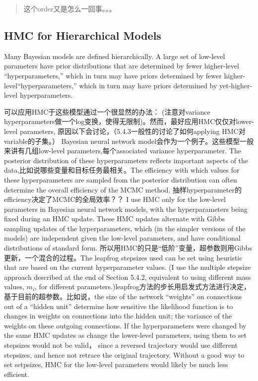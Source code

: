 \documentclass[
]{book}
\theoremstyle{definition}
\theoremstyle{definition}
\theoremstyle{definition}
\theoremstyle{remark}
\begin{document}
\begin{quote}
这个order又是怎么一回事。。。
\end{quote}

\hypertarget{hmc-for-hierarchical-models}{%
\subsection{HMC for Hierarchical Models}\label{hmc-for-hierarchical-models}}

Many Bayesian models are defined hierarchically. A large set of low-level parameters have prior distributions that are determined by fewer higher-level ``hyperparameters,'' which in turn may have priors determined by fewer higher-level``hyperparameters,'' which in turn may have priors determined by yet-higher-level hyperparameters.

可以应用HMC于这些模型通过一个很显然的办法： (注意对variance hyperparameters做一个log变换，使得无限制)。然而，最好应用HMC仅仅对lower-level parameters, 原因以下会讨论，（5.4.3一般性的讨论了如何applying HMC对variable的子集。）
Bayesian neural network model会作为一个例子。这些模型一般来讲有几组low-level parameters,每个associated variance hyperparameter. The posterior distribution of these hyperparameters reflects important aspects of the data,比如说哪些变量和目标任务最相关。The efficiency with which values for these hyperparameters are sampled from the posterior distribution can often determine the overall efficiency of the MCMC method.
抽样hyperparameter的efficiency决定了MCMC的全局效率？？
I use HMC only for the low-level parameters in Bayesian neural network models, with the hyperparameters being fixed during an HMC update. These HMC updates alternate with Gibbs sampling updates of the hyperparameters, which (in the simpler versions of the models) are independent given the low-level parameters, and have conditional distributions of standard form.
所以用HMC的只是``低阶''变量，超参数则用Gibbs更新，一个混合的过程。The leapfrog stepsizes used can be set using heuristic that are based on the current hyperparameter values. (I use the multiple stepsize approach described at the end of Section 5.4.2, equivalent to using different mass values, \(m_i\), for different parameters.)leapfrog方法的步长用启发式方法进行决定，基于目前的超参数。比如说，the size of the network ``weights'' on connections out of a ``hidden unit'' determine how sensitive the likelihood function is to changes in weights on connections into the hidden unit; the variance of the weights on these outgoing connections. If the hyperparameters were changed by the same HMC updates as change the lower-level parameters, using them to set stepsizes would not be valid， since a reversed trajectory would use different stepsizes, and hence not retrace the original trajectory. Without a good way to set setpsizes, HMC for the low-level parameters would likely be much less efficient.
\end{document}
